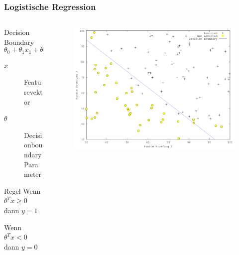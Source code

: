 \documentclass{beamer}
\begin{document}
\begin{frame}[fragile]
  \frametitle{Logistische Regression}
  \begin{columns}
    \begin{column}{.5\textwidth}

      \begin{block}{Decision Boundary}
        \[
        \theta_0 + \theta_1 x_1 + \theta_2 x_2 = 0
        \]
        \begin{description}
        \item[$x$] Featurevektor
        \item[$\theta$] Decisionboundary Parameter
        \end{description}
       \end{block}

      \begin{block}{Regel}
        Wenn $\theta^T x \geq 0$ dann $y=1$

        Wenn $\theta^T x < 0$ dann $y=0$
      \end{block}

    \end{column}
    \begin{column}{.5\textwidth}
      \begin{figure}
        \centering
        \includegraphics[scale=0.3]{decisionboundary}
      \end{figure}
    \end{column}
  \end{columns}
\end{frame}
\end{document}
